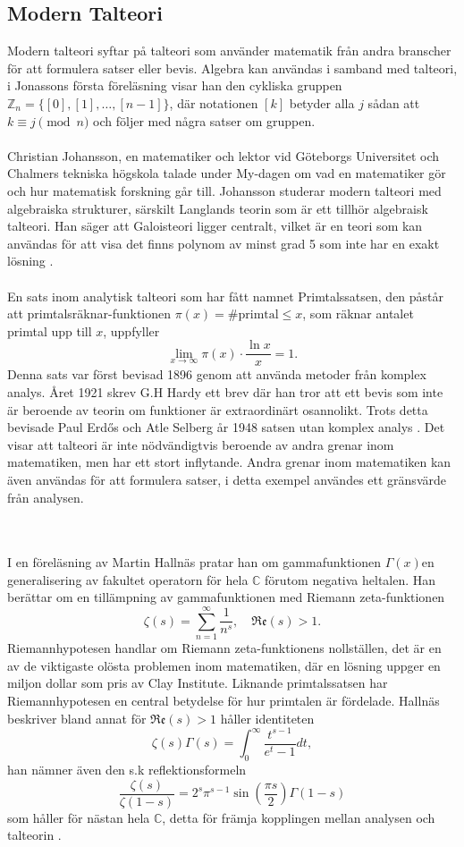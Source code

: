 \subsection*{Modern Talteori}
\iftrue
Modern talteori syftar på talteori som använder matematik från andra branscher för att formulera satser eller bevis. Algebra kan användas i samband med talteori, i Jonassons första föreläsning visar han den cykliska gruppen $\mathbb{Z}_n=\{[0],[1],\ldots,[n-1]\}$, där notationen $[k]$ betyder alla $j$ sådan att $k\equiv j \pmod n$ och följer med några satser om gruppen.
\\\\
Christian Johansson, en matematiker och lektor vid Göteborgs Universitet och Chalmers tekniska högskola talade under My-dagen om vad en matematiker gör och hur matematisk forskning går till. Johansson studerar modern talteori med algebraiska strukturer, särskilt Langlands teorin som är ett tillhör algebraisk talteori. Han säger att Galoisteori ligger centralt, vilket är en teori som kan användas för att visa det finns polynom av minst grad 5 som inte har en exakt lösning \cite{johansson}.
\\\\
En sats inom analytisk talteori som har fått namnet Primtalssatsen, den påstår att primtalsräknar-funktionen $\pi(x)= \text{\# primtal} \leq x$, som räknar antalet primtal upp till $x$, uppfyller $$\lim_{x\to \infty}\pi(x) \cdot \frac{\ln x}{x}=1.$$
Denna sats var först bevisad 1896 genom att använda metoder från komplex analys. Året 1921 skrev G.H Hardy ett brev där han tror att ett bevis som inte är beroende av teorin om funktioner är extraordinärt osannolikt. Trots detta bevisade Paul Erdős och Atle Selberg år 1948 satsen utan komplex analys \cite{Goldfeld2004, numbertheory:analytic}. Det visar att talteori är inte nödvändigtvis beroende av andra grenar inom matematiken, men har ett stort inflytande. Andra grenar inom matematiken kan även användas för att formulera satser, i detta exempel användes ett gränsvärde från analysen.
\fi
\\\\

I en föreläsning av Martin Hallnäs pratar han om gammafunktionen $\Gamma(x)$\textemdash en generalisering av fakultet operatorn för hela $\mathbb{C}$ förutom negativa heltalen. Han berättar om en tillämpning av gammafunktionen med Riemann zeta-funktionen
$$\zeta(s)=\sum_{n=1}^\infty\frac{1}{n^s}, \quad \mathfrak{Re}(s)>1.$$
Riemannhypotesen handlar om Riemann zeta-funktionens nollställen, det är en av de viktigaste olösta problemen inom matematiken, där en lösning uppger en miljon dollar som pris av Clay Institute. Liknande primtalssatsen har Riemannhypotesen en central betydelse för hur primtalen är fördelade.
Hallnäs beskriver bland annat för $\mathfrak{Re}(s)>1$ håller identiteten
$$\zeta(s)\Gamma(s)=\int_0^\infty\frac{t^{s-1}}{e^t-1}dt,$$
han nämner även den s.k reflektionsformeln
$$\frac{\zeta(s)}{\zeta(1-s)}=2^s \pi^{s-1}\sin{\left(\frac{\pi s}{2}\right)}\Gamma(1-s)$$
som håller för nästan hela $\mathbb{C}$, 
detta för främja kopplingen mellan analysen och talteorin \cite{hallnas}.



